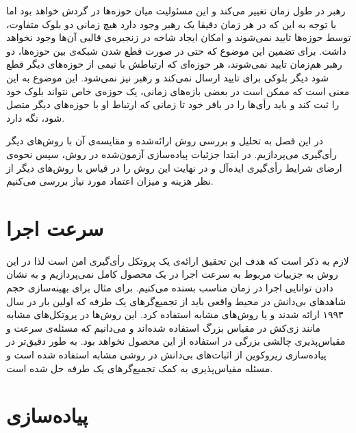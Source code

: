 \par 
رهبر در طول زمان تغییر می‌کند و این مسئولیت میان حوزه‌ها در گردش خواهد بود اما با توجه  به این که در هر زمان دقیقا یک رهبر وجود دارد هیچ زمانی دو بلوک متفاوت، توسط حوزه‌ها تایید نمی‌شوند و امکان ایجاد شاخه در زنجیره‌ی قالبی آن‌ها وجود نخواهد داشت. برای تضمین این موضوع که حتی در صورت قطع شدن شبکه‌ی بین حوزه‌ها، دو رهبر هم‌زمان تایید نمی‌شوند، هر حوزه‌ای که ارتباطش با نیمی از حوزه‌های دیگر قطع شود دیگر بلوکی برای تایید ارسال نمی‌کند و رهبر نیز نمی‌شود. این موضوع به این معنی است که ممکن است در بعضی بازه‌های زمانی، یک حوزه‌ی خاص نتواند بلوک خود را ثبت کند و باید رأی‌ها را در بافر خود تا زمانی که ارتباط او با حوزه‌های دیگر متصل شود، نگه‌ دارد.

در این فصل به تحلیل و بررسی روش ارائه‌شده و مقایسه‌ی آن با روش‌های دیگر رأی‌گیری می‌پردازیم. در ابتدا جزئیات پیاده‌سازی آزمون‌‌شده در روش، سپس نحوه‌ی ارضای شرایط رأی‌گیری ایده‌آل و در نهایت این روش را در قیاس با روش‌های دیگر از نظر هزینه و میزان اعتماد مورد نیاز بررسی می‌کنیم. 
\section{سرعت اجرا}
لازم به ذکر است که هدف این تحقیق ارائه‌ی یک پروتکل رأی‌گیری امن است لذا در این روش به جزییات مربوط به سرعت اجرا در یک محصول کامل نمی‌پردازیم و به نشان دادن توانایی اجرا در زمان مناسب بسنده می‌کنیم. برای مثال برای بهینه‌سازی حجم شاهد‌های بی‌دانش در محیط واقعی باید از تجمیع‌گر‌های یک طرفه 
که اولین بار در سال ۱۹۹۳ 
\cite{oneway}
ارائه شدند و یا روش‌های مشابه استفاده کرد. این روش‌ها در پروتکل‌های مشابه مانند زی‌کش در مقیاس بزرگ استفاده‌ شده‌اند و می‌دانیم که مسئله‌ی سرعت و مقیاس‌پذیری چالشی بزرگی در استفاده از این محصول نخواهد بود. به طور دقیق‌تر در پیاده‌سازی زیروکوین 
\cite{zerocoin}
از اثبات‌های بی‌دانش در روشی مشابه استفاده شده است و مسئله مقیاس‌پذیری به کمک تجمیع‌گرهای یک‌ طرفه حل شده است. 


\section{پیاده‌سازی}

